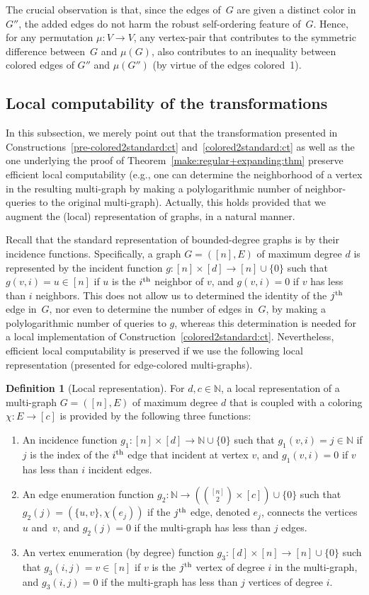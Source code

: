 \documentclass[10pt,a4paper]{article}
\theoremstyle{definition}
\newtheorem{definition}[theorem]{Definition}
\newcommand{\N}{\mathbb N}
\newcommand{\xth}{{\rm th}}
\newcommand{\BD}{\begin{definition}}   \newcommand{\ED}{\end{definition}}
\newcommand{\BE}{\begin{enumerate}}
\newcommand{\EE}{\end{enumerate}}
\begin{document}
The crucial observation is that, since the edges of~$G$
are given a distinct color in $G''$, the added edges
do not harm the robust self-ordering feature of~$G$.
Hence, for any permutation $\mu:V\to V$,
any vertex-pair that contributes to the symmetric difference
between~$G$ and $\mu(G)$, also contributes to an inequality
between colored edges of $G''$ and $\mu(G'')$
(by virtue of the edges colored~1).
\EPF


\subsection{Local computability of the transformations}
\label{edge-colored:local:sec}
In this subsection, we merely point out that the transformation
presented in Constructions~\ref{pre-colored2standard:ct}
and~\ref{colored2standard:ct} as well as the one underlying
the proof of Theorem~\ref{make:regular+expanding:thm}
preserve efficient local computability
(e.g., one can determine the neighborhood of a vertex in
the resulting multi-graph by making a polylogarithmic number
of neighbor-queries to the original multi-graph).
Actually, this holds provided that we augment the
(local) representation of graphs, in a natural manner.

Recall that the standard representation of bounded-degree graphs
is by their incidence functions.
Specifically, a graph $G=([n],E)$ of maximum degree $d$ is represented
by the {\sf incident function} $g:[n]\times[d]\to[n]\cup\{0\}$
such that $g(v,i)=u\in[n]$ if $u$ is the $i^\xth$ neighbor of $v$,
and $g(v,i)=0$ if $v$ has less than $i$ neighbors.
This does not allow us to determined the identity of the $j^\xth$
edge in~$G$, nor even to determine the number of edges in~$G$,
by making a polylogarithmic number of queries to $g$,
whereas this determination is needed for
a local implementation of Construction~\ref{colored2standard:ct}.
Nevertheless, efficient local computability is preserved
if we use the following local representation
(presented for edge-colored multi-graphs).

%
\BD[Local representation]
For $d,c\in\N$, a {\sf local representation}
of a multi-graph $G=([n],E)$ of maximum degree $d$
that is coupled with a coloring $\chi\!:\!E\!\to\![c]$
is provided by the following three functions:
\BE
\item
An incidence function $g_1:[n]\times[d]\to\N\cup\{0\}$
such that $g_1(v,i)=j\in\N$
if $j$ is the index of the $i^\xth$ edge that incident at vertex $v$,
and $g_1(v,i)=0$ if $v$ has less than $i$ incident edges.
\item
An edge enumeration function $g_2:\N\to(\binom{[n]}{2}\times[c])\cup\{0\}$
such that $g_2(j)=(\{u,v\},\chi(e_j))$ if the $j^\xth$ edge,
denoted $e_j$, connects the vertices $u$ and~$v$,
and $g_2(j)=0$ if the multi-graph has less than $j$ edges.
\item
An vertex enumeration {\rm(by degree)}
function $g_3:[d]\times[n]\to[n]\cup\{0\}$
such that $g_3(i,j)=v\in[n]$
if $v$ is the $j^\xth$ vertex of degree $i$ in the multi-graph,
and $g_3(i,j)=0$ if the multi-graph has less than $j$ vertices of degree $i$.
\EE
\ED
\end{document}
